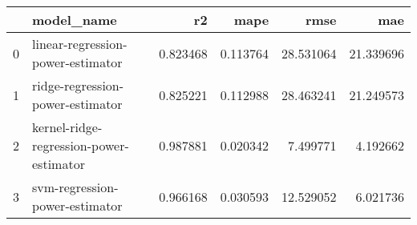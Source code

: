 \begin{tabular}{llrrrr}
\toprule
 & model_name & r2 & mape & rmse & mae \\
\midrule
0 & linear-regression-power-estimator & 0.823468 & 0.113764 & 28.531064 & 21.339696 \\
1 & ridge-regression-power-estimator & 0.825221 & 0.112988 & 28.463241 & 21.249573 \\
2 & kernel-ridge-regression-power-estimator & 0.987881 & 0.020342 & 7.499771 & 4.192662 \\
3 & svm-regression-power-estimator & 0.966168 & 0.030593 & 12.529052 & 6.021736 \\
\bottomrule
\end{tabular}
